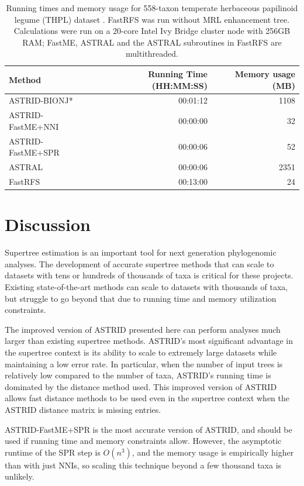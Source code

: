 \begin{table}[hbt!]
    \centering
\begin{tabular}{l|rr}
     Method & Running Time  (HH:MM:SS) & Memory usage (MB)\\
    \hline
     ASTRID-BIONJ* & 00:01:12 & 1108 \\
     ASTRID-FastME+NNI & 00:00:00 & 32 \\
     ASTRID-FastME+SPR & 00:00:06 & 52 \\
     ASTRAL & 00:00:06 & 2351 \\
     FastRFS & 00:13:00 & 24 \\
\end{tabular}
\caption[Running times and memory usage for 558-taxon temperate herbaceous papilinoid legume (THPL) dataset]{Running times and memory usage for 558-taxon temperate herbaceous papilinoid legume (THPL) dataset \cite{mcmahon2006phylogenetic}. FastRFS was run without MRL enhancement tree. Calculations were run on a 20-core Intel Ivy Bridge cluster node with 256GB RAM; FastME, ASTRAL and the ASTRAL subroutines in FastRFS are multithreaded.}
\label{astrid-missing::tab:thpl-runningtime}
\end{table}

\section{Discussion}

Supertree estimation is an important tool for next generation phylogenomic analyses. The development of accurate supertree methods that can scale to datasets with tens or hundreds of thousands of taxa is critical for these projects. Existing state-of-the-art methods can scale to datasets with thousands of taxa, but struggle to go beyond that due to running time and memory utilization constraints. 

The improved version of ASTRID presented here can perform analyses much larger than existing supertree methods. ASTRID's most significant advantage in the supertree context is its ability to scale to extremely large datasets while maintaining a low error rate. In particular, when the number of input trees is relatively low compared to the number of taxa, ASTRID's running time is dominated by the distance method used. This improved version of ASTRID allows fast distance methods to be used even in the supertree context when the ASTRID distance matrix is missing entries.

ASTRID-FastME+SPR is the most accurate version of ASTRID, and should be used if running time and memory constraints allow. However, the asymptotic runtime of the SPR step is $O(n^3)$, and the memory usage is empirically higher than with just NNIs, so scaling this technique beyond a few thousand taxa is unlikely.

